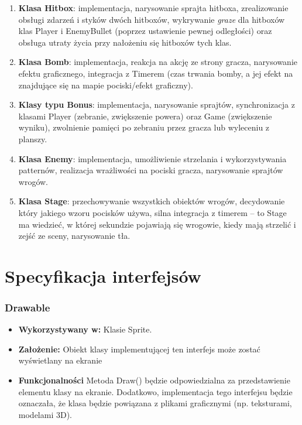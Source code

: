 \documentclass[a4paper,twoside]{article}
\begin{document}
\begin{enumerate}
	\item \textbf{Klasa Hitbox}: implementacja, narysowanie sprajta hitboxa, zrealizowanie obsługi zdarzeń i styków dwóch hitboxów, wykrywanie \textit{graze} dla hitboxów klas Player i EnemyBullet (poprzez ustawienie pewnej odległości) oraz obsługa utraty życia przy nałożeniu się hitboxów tych klas.
	
	\item \textbf{Klasa Bomb}: implementacja, reakcja na akcję ze strony gracza, narysowanie efektu graficznego, integracja z Timerem (czas trwania bomby, a jej efekt na znajdujące się na mapie pociski/efekt graficzny). 

	\item \textbf{Klasy typu Bonus}: implementacja, narysowanie sprajtów, synchronizacja z klasami Player (zebranie, zwiększenie powera) oraz Game (zwiększenie wyniku), zwolnienie pamięci po zebraniu przez gracza lub wyleceniu z planszy.

	\item \textbf{Klasa Enemy}: implementacja, umożliwienie strzelania i wykorzystywania patternów, realizacja wrażliwości na pociski gracza, narysowanie sprajtów wrogów.

	\item \textbf{Klasa Stage}: przechowywanie wszystkich obiektów wrogów, decydowanie który jakiego wzoru pocisków używa, silna integracja z timerem – to Stage ma wiedzieć, w której sekundzie pojawiają się wrogowie, kiedy mają strzelić i zejść ze sceny, narysowanie tła.
\end{enumerate}

\newpage

\part{\huge \textbf{Specyfikacja interfejsów}}

\section{Drawable}

\begin{itemize}
	\item \textbf{Wykorzystywany w:} Klasie Sprite.
	\item \textbf{Założenie:} Obiekt klasy implementującej ten interfejs może zostać wyświetlany na ekranie 
	\item \textbf{Funkcjonalności} Metoda Draw() będzie odpowiedzialna za przedstawienie elementu klasy na ekranie. Dodatkowo, implementacja tego interfejsu będzie oznaczała, że klasa będzie powiązana z plikami graficznymi (np. teksturami, modelami 3D).
\end{itemize}
\end{document}
